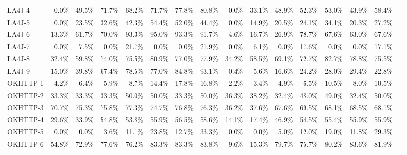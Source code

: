 \begin{tabular}{ l rrrrrrr rrrrrrrr}
LA4J-4 & \cellcolor{light-gray} \textcolor{black}{0.0}\% & 49.5\% & 71.7\% & 68.2\% & 71.7\% & 77.8\% & 80.8\% & \cellcolor{light-gray} \textcolor{black}{0.0}\% & 33.1\% & 48.9\% & 52.3\% & 53.0\% & 43.9\% & 58.4\%\\ 
LA4J-5 & \cellcolor{light-gray} \textcolor{black}{0.0}\% & 23.5\% & 32.6\% & 42.3\% & 54.4\% & 52.0\% & 44.4\% & \cellcolor{light-gray} \textcolor{black}{0.0}\% & 14.9\% & 20.5\% & 24.1\% & 34.1\% & 20.3\% & 27.2\%\\ 
LA4J-6 & 13.3\% & 61.7\% & 70.0\% & 93.3\% & 95.0\% & 93.3\% & 91.7\% & 4.6\% & 16.7\% & 26.9\% & 78.7\% & 67.6\% & 63.0\% & 67.6\%\\ 
LA4J-7 & \cellcolor{light-gray} \textcolor{black}{0.0}\% & 7.5\% & \cellcolor{light-gray} \textcolor{black}{0.0}\% & 21.7\% & \cellcolor{light-gray} \textcolor{black}{0.0}\% & \cellcolor{light-gray} \textcolor{black}{0.0}\% & 21.9\% & \cellcolor{light-gray} \textcolor{black}{0.0}\% & 6.1\% & \cellcolor{light-gray} \textcolor{black}{0.0}\% & 17.6\% & \cellcolor{light-gray} \textcolor{black}{0.0}\% & \cellcolor{light-gray} \textcolor{black}{0.0}\% & 17.1\%\\ 
LA4J-8 & 32.4\% & 59.8\% & 74.0\% & 75.5\% & 80.9\% & 77.0\% & 77.9\% & 34.2\% & 58.5\% & 69.1\% & 72.7\% & 82.7\% & 78.8\% & 75.5\%\\ 
LA4J-9 & 15.0\% & 39.8\% & 67.4\% & 78.5\% & 77.0\% & 84.8\% & 93.1\% & 0.4\% & 5.6\% & 16.6\% & 24.2\% & 28.0\% & 29.4\% & 22.8\%\\ 
OKHTTP-1 & 4.2\% & 6.4\% & 5.9\% & 8.7\% & 14.4\% & 17.8\% & 16.8\% & 2.2\% & 3.4\% & 4.9\% & 6.5\% & 10.5\% & 8.0\% & 10.5\%\\ 
OKHTTP-2 & 33.3\% & 33.3\% & 33.3\% & 50.0\% & 50.0\% & 33.3\% & 50.0\% & 36.3\% & 38.2\% & 32.4\% & 48.0\% & 49.0\% & 32.4\% & 50.0\%\\ 
OKHTTP-3 & 70.7\% & 75.3\% & 75.8\% & 77.3\% & 74.7\% & 76.8\% & 76.3\% & 36.2\% & 37.6\% & 67.6\% & 69.5\% & 68.1\% & 68.5\% & 68.1\%\\ 
OKHTTP-4 & 29.6\% & 33.9\% & 54.8\% & 53.8\% & 55.9\% & 56.5\% & 58.6\% & 14.1\% & 17.4\% & 46.9\% & 54.5\% & 55.4\% & 55.9\% & 55.9\%\\ 
OKHTTP-5 & \cellcolor{light-gray} \textcolor{black}{0.0}\% & \cellcolor{light-gray} \textcolor{black}{0.0}\% & 3.6\% & 11.1\% & 23.8\% & 12.7\% & 33.3\% & \cellcolor{light-gray} \textcolor{black}{0.0}\% & \cellcolor{light-gray} \textcolor{black}{0.0}\% & 5.0\% & 12.0\% & 19.0\% & 11.8\% & 29.3\%\\ 
OKHTTP-6 & 54.8\% & 72.9\% & 77.6\% & 76.2\% & 83.3\% & 83.3\% & 83.8\% & 9.6\% & 15.3\% & 79.7\% & 75.7\% & 80.2\% & 83.6\% & 81.9\%\\ 

\end{tabular}
